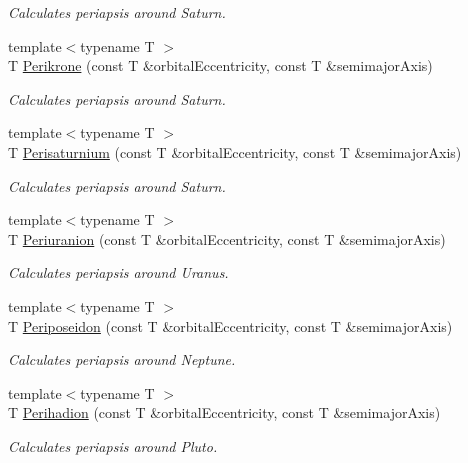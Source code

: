 \begin{DoxyCompactItemize}
\begin{DoxyCompactList}\small\item\em Calculates periapsis around Saturn. \end{DoxyCompactList}\item 
{\footnotesize template$<$typename T $>$ }\\T \mbox{\hyperlink{group___e_g_x_phys-_periapsis_gaa56f74c44a3583b8f0d13b821c1d7422}{Perikrone}} (const T \&orbital\+Eccentricity, const T \&semimajor\+Axis)
\begin{DoxyCompactList}\small\item\em Calculates periapsis around Saturn. \end{DoxyCompactList}\item 
{\footnotesize template$<$typename T $>$ }\\T \mbox{\hyperlink{group___e_g_x_phys-_periapsis_ga60a50d09d29ebe47cbbfc125c2ea42bf}{Perisaturnium}} (const T \&orbital\+Eccentricity, const T \&semimajor\+Axis)
\begin{DoxyCompactList}\small\item\em Calculates periapsis around Saturn. \end{DoxyCompactList}\item 
{\footnotesize template$<$typename T $>$ }\\T \mbox{\hyperlink{group___e_g_x_phys-_periapsis_gab8b8131a617dd2d2a4de1d48accd7442}{Periuranion}} (const T \&orbital\+Eccentricity, const T \&semimajor\+Axis)
\begin{DoxyCompactList}\small\item\em Calculates periapsis around Uranus. \end{DoxyCompactList}\item 
{\footnotesize template$<$typename T $>$ }\\T \mbox{\hyperlink{group___e_g_x_phys-_periapsis_ga237e7af3794202c67e65f64f4c8abc2a}{Periposeidon}} (const T \&orbital\+Eccentricity, const T \&semimajor\+Axis)
\begin{DoxyCompactList}\small\item\em Calculates periapsis around Neptune. \end{DoxyCompactList}\item 
{\footnotesize template$<$typename T $>$ }\\T \mbox{\hyperlink{group___e_g_x_phys-_periapsis_gafb16e46e55078b38604eef0d7c7c40c4}{Perihadion}} (const T \&orbital\+Eccentricity, const T \&semimajor\+Axis)
\begin{DoxyCompactList}\small\item\em Calculates periapsis around Pluto. \end{DoxyCompactList}\item 

\end{DoxyCompactItemize}
